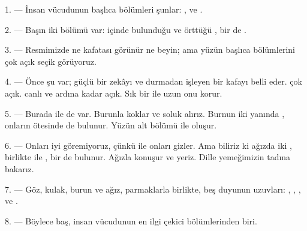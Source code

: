 
\VUsaut{4.0mm}
\VUsaut{2.0mm}

\VUsaut{2.4mm}
\VUsaut{3.0mm}

1. --- İnsan vücudunun başlıca bölümleri şunlar: ,
 ve .

\VUsaut{3.0mm}

2. --- Başın iki bölümü var: içinde  bulunduğu ve
 örttüğü , bir de .

3. --- Resmimizde ne kafatası görünür ne beyin; ama yüzün başlıca bölümlerini
çok açık seçik görüyoruz.

4. --- Önce şu  var; güçlü bir zekâyı ve durmadan işleyen bir
kafayı belli eder.  çok açık.  canlı ve ardına
kadar açık. Sık bir  ile uzun  onu korur.

5. --- Burada  ile  de var. Burunla
koklar ve soluk alırız. Burnun iki yanında , onların ötesinde
de  bulunur. Yüzün alt bölümü  ile
 oluşur.

6. --- Onları iyi göremiyoruz, çünkü  ile  onları
gizler. Ama biliriz ki ağızda iki ,  birlikte
 ile , bir de  bulunur. Ağızla
konuşur ve yeriz. Dille yemeğimizin tadına bakarız.

7. --- Göz, kulak, burun ve ağız, parmaklarla birlikte, beş duyunun
uzuvları: , , ,
 ve .

8. --- Böylece baş, insan vücudunun en ilgi çekici bölümlerinden biri.

